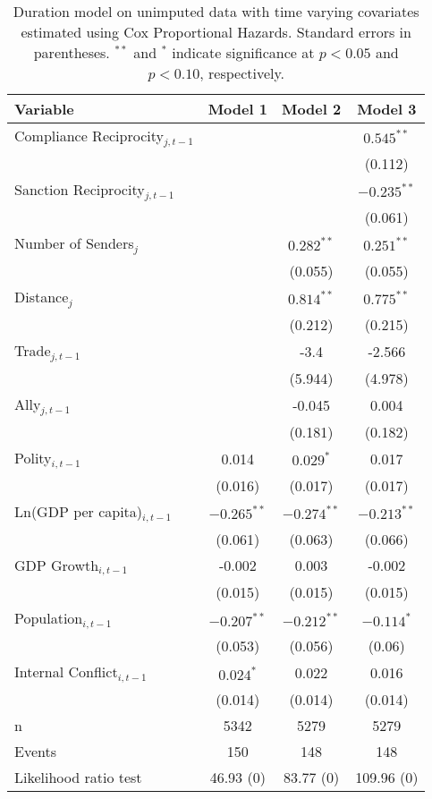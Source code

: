 \begin{table}[ht]
\centering
{\normalsize
\begin{tabular}{lccc}
 Variable & Model 1 & Model 2 & Model 3 \\ 
  \hline
\hline
Compliance Reciprocity$_{j,t-1}$ &  &  & $0.545^{\ast\ast}$ \\ 
   &  &  & (0.112) \\ 
  Sanction Reciprocity$_{j,t-1}$ &  &  & $-0.235^{\ast\ast}$ \\ 
   &  &  & (0.061) \\ 
   \hline
Number of Senders$_{j}$ &  & $0.282^{\ast\ast}$ & $0.251^{\ast\ast}$ \\ 
   &  & (0.055) & (0.055) \\ 
  Distance$_{j}$ &  & $0.814^{\ast\ast}$ & $0.775^{\ast\ast}$ \\ 
   &  & (0.212) & (0.215) \\ 
  Trade$_{j,t-1}$ &  & -3.4 & -2.566 \\ 
   &  & (5.944) & (4.978) \\ 
  Ally$_{j,t-1}$ &  & -0.045 & 0.004 \\ 
   &  & (0.181) & (0.182) \\ 
   \hline
Polity$_{i,t-1}$ & 0.014 & $0.029^{\ast}$ & 0.017 \\ 
   & (0.016) & (0.017) & (0.017) \\ 
  Ln(GDP per capita)$_{i,t-1}$ & $-0.265^{\ast\ast}$ & $-0.274^{\ast\ast}$ & $-0.213^{\ast\ast}$ \\ 
   & (0.061) & (0.063) & (0.066) \\ 
  GDP Growth$_{i,t-1}$ & -0.002 & 0.003 & -0.002 \\ 
   & (0.015) & (0.015) & (0.015) \\ 
  Population$_{i,t-1}$ & $-0.207^{\ast\ast}$ & $-0.212^{\ast\ast}$ & $-0.114^{\ast}$ \\ 
   & (0.053) & (0.056) & (0.06) \\ 
  Internal Conflict$_{i,t-1}$ & $0.024^{\ast}$ & 0.022 & 0.016 \\ 
   & (0.014) & (0.014) & (0.014) \\ 
   \hline
n & 5342 & 5279 & 5279 \\ 
  Events & 150 & 148 & 148 \\ 
  Likelihood ratio test & 46.93 (0) & 83.77 (0) & 109.96 (0) \\ 
   \hline
\hline
\end{tabular}
}
\caption{Duration model on unimputed data with time varying covariates estimated using Cox Proportional Hazards. Standard errors in parentheses. $^{**}$ and $^{*}$ indicate significance at $p< 0.05 $ and $p< 0.10 $, respectively.} 
\label{tab:regResultsNoImp}
\end{table}
